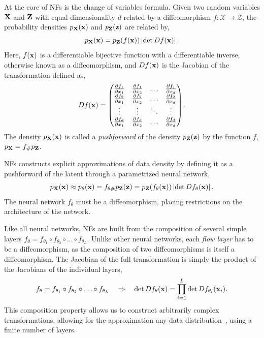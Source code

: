 At the core of NFs is the change of variables formula.
Given two random variables $\mathbf{X}$ and $\mathbf{Z}$ with equal dimensionality $d$ related by a diffeomorphism $f: \mathcal{X} \rightarrow \mathcal{Z}$, the probability densities $p_{\mathbf{X}}(\mathbf{x})$ and $p_{\mathbf{Z}}(\mathbf{z})$ are related by,
\begin{equation}
    \label{eq:change_of_variables}
    p_{\mathbf{X}}(\mathbf{x}) = p_{\mathbf{Z}}(f(\mathbf{x})) \left|\det D f(\mathbf{x}) \right|.
\end{equation}
Here, $f(\mathbf{x})$ is a differentiable bijective function with a differentiable inverse, otherwise known as a diffeomorphism, and $D f(\mathbf{x})$ is the Jacobian of the transformation defined as,
\begin{equation}
    D f(\mathbf{x}) = \begin{pmatrix}
        \frac{\partial f_1}{\partial x_1} & \frac{\partial f_1}{\partial x_2} & \ldots & \frac{\partial f_1}{\partial x_d} \\
        \frac{\partial f_2}{\partial x_1} & \frac{\partial f_2}{\partial x_2} & \ldots & \frac{\partial f_2}{\partial x_d} \\
        \vdots                            & \vdots                            & \ddots & \vdots                            \\
        \frac{\partial f_d}{\partial x_1} & \frac{\partial f_d}{\partial x_2} & \ldots & \frac{\partial f_d}{\partial x_d}
    \end{pmatrix}.
\end{equation}
The density $p_{\mathbf{X}}(\mathbf{x})$ is called a \textit{pushforward} of the density $p_{\mathbf{Z}}(\mathbf{z})$ by the function $f$, $p_{\mathbf{X}} = f_\# p_{\mathbf{Z}}$.

NFs constructs explicit approximations of data density by defining it as a pushforward of the latent through a parametrized neural network,
\begin{equation}
    p_{\mathbf{X}}(\mathbf{x}) \approx p_{\theta}(\mathbf{x}) = f_{\theta \#} p_{\mathbf{Z}}(\mathbf{z}) = p_{\mathbf{Z}}(f_{\theta}(\mathbf{x})) \left|\det D f_{\theta}(\mathbf{x}) \right|.
\end{equation}
The neural network $f_{\theta}$ must be a diffeomorphism, placing restrictions on the architecture of the network.

Like all neural networks, NFs are built from the composition of several simple layers $f_\theta = f_{\theta_1} \circ f_{\theta_2} \circ \ldots \circ f_{\theta_L}$.
Unlike other neural networks, each \textit{flow layer} has to be a diffeomorphism, as the composition of two diffeomorphisms is itself a diffeomorphism.
The Jacobian of the full transformation is simply the product of the Jacobians of the individual layers,
\begin{equation}
    f_\theta = f_{\theta_1} \circ f_{\theta_2} \circ \ldots \circ f_{\theta_L} \quad \Rightarrow \quad \det D f_\theta(\mathbf{x}) = \prod_{i=1}^L \det D f_{\theta_i}(\mathbf{x}_i).
\end{equation}
This composition property allows us to construct arbitrarily complex transformations, allowing for the approximation any data distribution~\cite{bogachev2005triangular}, using a finite number of layers.

